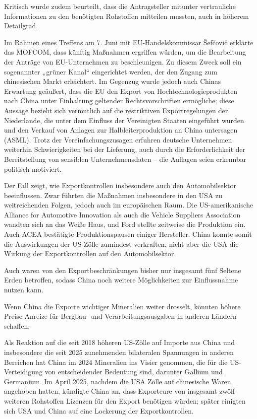 \documentclass[12pt,a4paper,oneside]{book} %
\begin{document}
Kritisch wurde zudem beurteilt, dass die Antragsteller mitunter vertrauliche Informationen zu den benötigten Rohstoffen mitteilen mussten, auch in höherem Detailgrad.

Im Rahmen eines Treffens am 7. Juni mit EU-Handelskommissar Šefčovič erklärte das MOFCOM, dass künftig Maßnahmen ergriffen würden, um die Bearbeitung der Anträge von EU-Unternehmen zu beschleunigen. Zu diesem Zweck soll ein sogenannter „grüner Kanal“ eingerichtet werden, der den Zugang zum chinesischen Markt erleichtert. Im Gegenzug wurde jedoch auch Chinas Erwartung geäußert, dass die EU den Export von Hochtechnologieprodukten nach China unter Einhaltung geltender Rechtsvorschriften ermögliche; diese Aussage bezieht sich vermutlich auf die restriktiven Exportregelungen der Niederlande, die unter dem Einfluss der Vereinigten Staaten eingeführt wurden und den Verkauf von Anlagen zur Halbleiterproduktion an China untersagen (ASML). 
Trotz der Vereinfachungszusagen erfuhren deutsche Unternehmen weiterhin Schwierigkeiten bei der Lieferung, auch durch die Erforderlichkeit der Bereitstellung von sensiblen Unternehmensdaten -- die Auflagen seien \glqq erkennbar politisch motiviert\grqq.\autocite{Wirtschaft fordert mehr Tempo bei Rohstofffonds}



Der Fall zeigt, wie Exportkontrollen insbesondere auch den Automobilsektor beeinflussen. Zwar führten die  Maßnahmen insbesondere in den USA zu weitreichenden Folgen, jedoch auch im europäischen Raum. Die US-amerikanische Alliance for Automotive Innovation als auch die Vehicle Suppliers Association wandten sich an das Weiße Haus, und Ford stellte zeitweise die Produktion ein. Auch ACEA bestätigte Produktionspausen einiger Hersteller. China konnte somit die Auswirkungen der US-Zölle zumindest verkraften, nicht aber die USA die Wirkung der Exportkontrollen auf den Automobilsektor.

Auch waren von den Exportbeschränkungen bisher nur insgesamt fünf Seltene Erden betroffen, sodass China noch weitere Möglichkeiten zur Einflussnahme nutzen kann.



Wenn China die Exporte wichtiger Mineralien weiter drosselt, könnten höhere Preise Anreize für Bergbau- und Verarbeitungsausgaben in anderen Ländern schaffen.

Als Reaktion auf die seit 2018 höheren US-Zölle auf Importe aus China und insbesondere die seit 2025 zunehmenden bilateralen Spannungen in anderen Bereichen hat China im 2024 Mineralien ins Visier genommen, die für die US-Verteidigung von entscheidender Bedeutung sind, darunter Gallium und Germanium. Im April 2025, nachdem die USA Zölle auf chinesische Waren angehoben hatten, kündigte China an, dass Exporteure von insgesamt zwölf weiteren Rohstoffen Lizenzen für den Export benötigen würden; später einigten sich USA und China auf eine Lockerung der Exportkontrollen.
\end{document}
